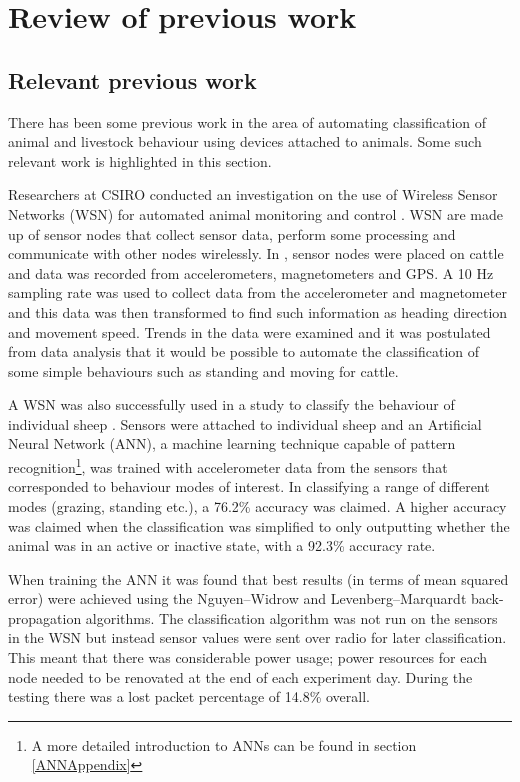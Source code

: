 \chapter{Review of previous work}

\section{Relevant previous work}
There has been some previous work in the area of automating classification of animal and livestock behaviour using devices attached to animals. Some such relevant work is highlighted in this section. 

Researchers at CSIRO conducted an investigation on the use of Wireless Sensor Networks (WSN) for automated animal monitoring and control \cite{Guo2006}. WSN are made up of sensor nodes that collect sensor data, perform some processing and communicate with other nodes wirelessly. In \cite{Guo2006}, sensor nodes were placed on cattle and data was recorded from accelerometers, magnetometers and GPS. A 10 Hz sampling rate was used to collect data from the accelerometer and magnetometer and this data was then transformed to find such information as heading direction and movement speed. Trends in the data were examined and it was postulated from data analysis that it would be possible to automate the classification of some simple behaviours such as standing and moving for cattle. 

A WSN was also successfully used in a study to classify the behaviour of individual sheep \cite{Nadimi2012}. Sensors were attached to individual sheep and an Artificial Neural Network (ANN), a machine learning technique capable of pattern recognition\footnote{A more detailed introduction to ANNs can be found in section \ref{ANNAppendix}}, was trained with accelerometer data from the sensors that corresponded to behaviour modes of interest. In classifying a range of different modes (grazing, standing etc.), a 76.2\% accuracy was claimed. A higher accuracy was claimed when the classification was simplified to only outputting whether the animal was in an active or inactive state, with a 92.3\% accuracy rate.

When training the ANN it was found that best results (in terms of mean squared error) were achieved using the Nguyen–Widrow and Levenberg–Marquardt back-propagation algorithms. The classification algorithm was not run on the sensors in the WSN but instead sensor values were sent over radio for later classification. This meant that there was considerable power usage; power resources for each node needed to be renovated at the end of each experiment day. During the testing there was a lost packet percentage of 14.8\% overall.

